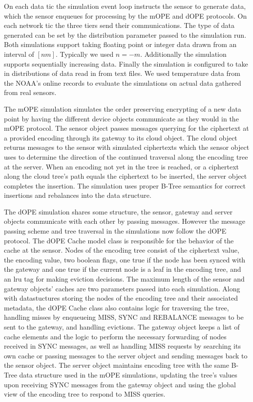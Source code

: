 \documentclass[12pt]{article}
\begin{document}
On each data tic the simulation event loop instructs the sensor to generate data, which the sensor enqueues for processing by the mOPE and dOPE protocols.  On each network tic the three tiers send their communications.  The type of data generated can be set by the distribution parameter passed to the simulation run.  Both simulations support taking floating point or integer data drawn from an interval of $[n m]$.  Typically we used $n = -m$.  Additionally the simulation supports sequentially increasing data.  Finally the simulation is configured to take in distributions of data read in from text files.  We used temperature data from the NOAA's online records to evaluate the simulations on actual data gathered from real sensors.

The mOPE simulation simulates the order preserving encrypting of a new data point by having the different device objects communicate as they would in the mOPE protocol.  The sensor object passes messages querying for the ciphertext at a provided encoding through its gateway to its cloud object.  The cloud object returns messages to the sensor with simulated ciphertexts which the sensor object uses to determine the direction of the continued traversal along the encoding tree at the server.  When an encoding not yet in the tree is reached, or a ciphertext along the cloud tree's path equals the ciphertext to be inserted, the server object completes the insertion.  The simulation uses proper B-Tree semantics for correct insertions and rebalances into the data structure.

The dOPE simulation shares some structure, the sensor, gateway and server objects communicate with each other by passing messages.  However the message passing scheme and tree traversal in the simulations now follow the dOPE protocol.  The dOPE Cache model class is responsible for the behavior of the cache at the sensor.  Nodes of the encoding tree consist of the ciphertext value, the encoding value, two boolean flags, one true if the node has been synced with the gateway and one true if the current node is a leaf in the encoding tree, and an lru tag for making eviction decisions.  The maximum length of the sensor and gateway objects' caches are two parameters passed into each simulation.  Along with datastuctures storing the nodes of the encoding tree and their associated metadata, the dOPE Cache class also contains logic for traversing the tree, handling misses by enqueueing MISS, SYNC and REBALANCE messages to be sent to the gateway, and handling evictions.  The gateway object keeps a list of cache elements and the logic to perform the necessary forwarding of nodes received in SYNC messages, as well as handling MISS requests by searching its own cache or passing messages to the server object and sending messages back to the sensor object.  The server object maintains encoding tree with the same B-Tree data structure  used in the mOPE simulations, updating the tree's values upon receiving SYNC messages from the gateway object and using the global view of the encoding tree to respond to MISS queries.
\end{document}
